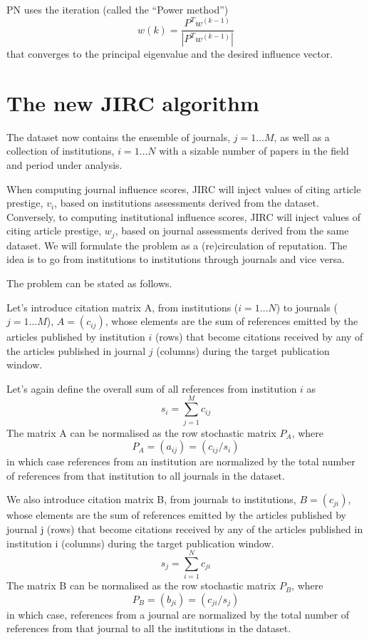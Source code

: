 \documentclass[10pt]{article}
\begin{document}
\noindent PN uses the iteration (called the “Power method”)
\begin{equation}
w(k)=\frac{P^Tw^{(k-1)}}{|P^Tw^{(k-1)}|}
\end{equation}
that converges to the principal eigenvalue and the desired influence vector.

\section{ The new JIRC algorithm}
 The dataset now contains the ensemble of journals,
 $j=1\ldots M$, as well as a collection of institutions, $i=1\ldots N$ with a sizable number of papers  in the field and period under analysis.

When computing journal influence scores, JIRC will inject  values of citing article prestige, $v_i$, based on institutions assessments derived from the  dataset. Conversely, to
 computing institutional influence scores, JIRC will inject  values of citing article prestige, $w_j$, based on journal assessments derived from the same dataset.
We will formulate the problem as a (re)circulation of reputation. The idea is to go from institutions to institutions through journals and vice versa.

\noindent The problem can be stated as follows.

Let's introduce  citation matrix A, from institutions ($i=1\ldots N$) to journals ($j=1\ldots M$), $A = (c_{ij})$,  whose elements are the sum of references emitted by
the articles published by institution $i$ (rows) that become citations received by any of the articles published in journal $j$ (columns) during the target
publication window.

\noindent Let's again define the overall sum of all references from institution $i$ as
\begin{equation}
s_i = \sum_{j=1}^Mc_{ij}
\end{equation}
The matrix A can be normalised as the row stochastic matrix $P_A$, where
\begin{equation}
P_A = (a_{ij}) = (c_{ij}/s_i)
\label{pa}
\end{equation}
in which case references from an institution are normalized by the total number of references from that institution to all journals in the dataset.


We also  introduce  citation matrix B, from journals  to institutions, $B = (c_{ji})$,  whose elements are the sum of references emitted by
the articles published by journal j (rows) that become citations received by any of the articles published in institution i (columns) during the target
publication window.
\begin{equation}
s_j = \sum_{i=1}^Nc_{ji}
\end{equation}
The matrix B can be normalised as the row stochastic matrix $P_B$, where
\begin{equation}
P_B = (b_{ji}) = (c_{ji}/s_j)
\label{pb}
\end{equation}
in which case, references from a journal are normalized by the total number of references from that journal to all the institutions in the dataset.
\end{document}
